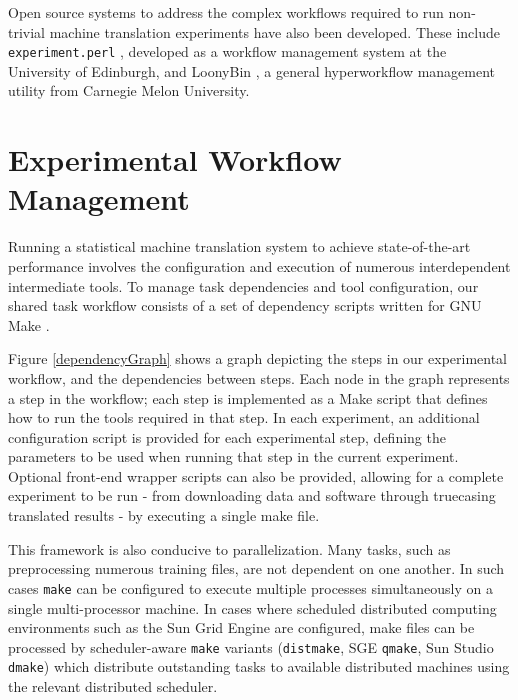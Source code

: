 \documentclass[11pt, a4paper]{article}
\begin{document}
Open source systems to address the complex workflows required to run non-trivial machine translation experiments have also been developed. These include {\tt experiment.perl} \cite{experiment.perl}, developed as a workflow management system at the University of Edinburgh, and LoonyBin \cite{LoonyBin}, a general hyperworkflow management utility from Carnegie Melon University.







\section{Experimental Workflow Management}
\label{Framework}


Running a statistical machine translation system to achieve state-of-the-art performance involves the configuration and execution of numerous interdependent intermediate tools. To manage task dependencies and tool configuration, our shared task workflow consists of a set of dependency scripts written for GNU Make \cite{gnumake}. 

Figure \ref{dependencyGraph} shows a graph depicting the steps in our experimental workflow, and the dependencies between steps. Each node in the graph represents a step in the workflow; each step is implemented as a Make script that defines how to run the tools required in that step. In each experiment, an additional configuration script is provided for each experimental step, defining the parameters to be used when running that step in the current experiment. Optional front-end wrapper scripts can also be provided, allowing for a complete experiment to be run - from downloading data and software through truecasing translated results - by executing a single make file.

This framework is also conducive to parallelization. Many tasks, such as preprocessing numerous training files, are not dependent on one another. In such cases {\tt make} can be configured to execute multiple processes simultaneously on a single multi-processor machine. In cases where scheduled distributed computing environments such as the Sun Grid Engine are configured, make files can be processed by scheduler-aware {\tt make} variants ({\tt distmake}, SGE {\tt qmake}, Sun Studio {\tt dmake}) which distribute outstanding tasks to available distributed machines using the relevant distributed scheduler.
\end{document}
